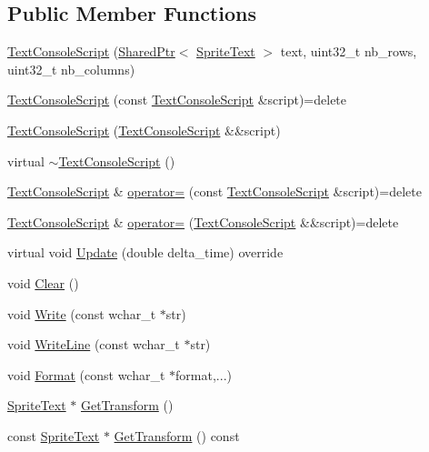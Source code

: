 \subsection*{Public Member Functions}
\begin{DoxyCompactItemize}
\item 
\hyperlink{classmage_1_1_text_console_script_a5da87d9a6b1a70f31a9b906beb5587bc}{Text\+Console\+Script} (\hyperlink{namespacemage_a1e01ae66713838a7a67d30e44c67703e}{Shared\+Ptr}$<$ \hyperlink{classmage_1_1_sprite_text}{Sprite\+Text} $>$ text, uint32\+\_\+t nb\+\_\+rows, uint32\+\_\+t nb\+\_\+columns)
\item 
\hyperlink{classmage_1_1_text_console_script_ad31e204ced04dc42fb98397df6015198}{Text\+Console\+Script} (const \hyperlink{classmage_1_1_text_console_script}{Text\+Console\+Script} \&script)=delete
\item 
\hyperlink{classmage_1_1_text_console_script_a6d245efb103011f1b2e2c43c590c22bf}{Text\+Console\+Script} (\hyperlink{classmage_1_1_text_console_script}{Text\+Console\+Script} \&\&script)
\item 
virtual \hyperlink{classmage_1_1_text_console_script_a3269d6b792053d4ce13d63103ca5b4e9}{$\sim$\+Text\+Console\+Script} ()
\item 
\hyperlink{classmage_1_1_text_console_script}{Text\+Console\+Script} \& \hyperlink{classmage_1_1_text_console_script_af7da3f0735f72fed0d6fc265b6ae07e9}{operator=} (const \hyperlink{classmage_1_1_text_console_script}{Text\+Console\+Script} \&script)=delete
\item 
\hyperlink{classmage_1_1_text_console_script}{Text\+Console\+Script} \& \hyperlink{classmage_1_1_text_console_script_a2a14c6a981fe7ded4e7a4fa5480ac6cb}{operator=} (\hyperlink{classmage_1_1_text_console_script}{Text\+Console\+Script} \&\&script)=delete
\item 
virtual void \hyperlink{classmage_1_1_text_console_script_a7b1acbf48376b650c08fa941a63ffa98}{Update} (double delta\+\_\+time) override
\item 
void \hyperlink{classmage_1_1_text_console_script_aff5acec462f505735720a17d541ba912}{Clear} ()
\item 
void \hyperlink{classmage_1_1_text_console_script_a659586a498f8ff0f55aa2a3f25f0828b}{Write} (const wchar\+\_\+t $\ast$str)
\item 
void \hyperlink{classmage_1_1_text_console_script_a24fe33795c69e70d07a680826cfafcc1}{Write\+Line} (const wchar\+\_\+t $\ast$str)
\item 
void \hyperlink{classmage_1_1_text_console_script_a4d9ba97e4ff4ad5390b20e5523a20e92}{Format} (const wchar\+\_\+t $\ast$format,...)
\item 
\hyperlink{classmage_1_1_sprite_text}{Sprite\+Text} $\ast$ \hyperlink{classmage_1_1_text_console_script_a4ca556738d1a1892944c6973442c4d22}{Get\+Transform} ()
\item 
const \hyperlink{classmage_1_1_sprite_text}{Sprite\+Text} $\ast$ \hyperlink{classmage_1_1_text_console_script_a8c65fa13d8c56b15c63ce918439c2669}{Get\+Transform} () const
\end{DoxyCompactItemize}
